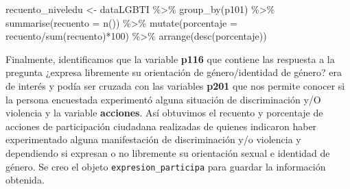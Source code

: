 \documentclass[
]{book}
\newenvironment{Shaded}{\begin{snugshade}}{\end{snugshade}}
\newcommand{\AttributeTok}[1]{\textcolor[rgb]{0.77,0.63,0.00}{#1}}
\newcommand{\DecValTok}[1]{\textcolor[rgb]{0.00,0.00,0.81}{#1}}
\newcommand{\FunctionTok}[1]{\textcolor[rgb]{0.00,0.00,0.00}{#1}}
\newcommand{\NormalTok}[1]{#1}
\newcommand{\OtherTok}[1]{\textcolor[rgb]{0.56,0.35,0.01}{#1}}
\newcommand{\SpecialCharTok}[1]{\textcolor[rgb]{0.00,0.00,0.00}{#1}}
\theoremstyle{definition}
\theoremstyle{definition}
\theoremstyle{definition}
\theoremstyle{definition}
\theoremstyle{remark}
\begin{document}
\begin{Shaded}
\begin{Highlighting}[]
\NormalTok{recuento\_niveledu }\OtherTok{\textless{}{-}}\NormalTok{ dataLGBTI }\SpecialCharTok{\%\textgreater{}\%} 
  \FunctionTok{group\_by}\NormalTok{(p101) }\SpecialCharTok{\%\textgreater{}\%} 
  \FunctionTok{summarise}\NormalTok{(}\AttributeTok{recuento =} \FunctionTok{n}\NormalTok{()) }\SpecialCharTok{\%\textgreater{}\%} 
  \FunctionTok{mutate}\NormalTok{(}\AttributeTok{porcentaje =}\NormalTok{ recuento}\SpecialCharTok{/}\FunctionTok{sum}\NormalTok{(recuento)}\SpecialCharTok{*}\DecValTok{100}\NormalTok{) }\SpecialCharTok{\%\textgreater{}\%} 
  \FunctionTok{arrange}\NormalTok{(}\FunctionTok{desc}\NormalTok{(porcentaje)) }
\end{Highlighting}
\end{Shaded}

Finalmente, identificamos que la variable \textbf{p116} que contiene las respuesta a la pregunta ¿expresa libremente su orientación de género/identidad de género? era de interés y podía ser cruzada con las variables \textbf{p201} que nos permite conocer si la persona encuestada experimentó alguna situación de discriminación y/O violencia y la variable \textbf{acciones}. Así obtuvimos el recuento y porcentaje de acciones de participación ciudadana realizadas de quienes indicaron haber experimentado alguna manifestación de discriminación y/o violencia y dependiendo si expresan o no libremente su orientación sexual e identidad de género. Se creo el objeto \texttt{expresion\_participa} para guardar la información obtenida.
\end{document}
